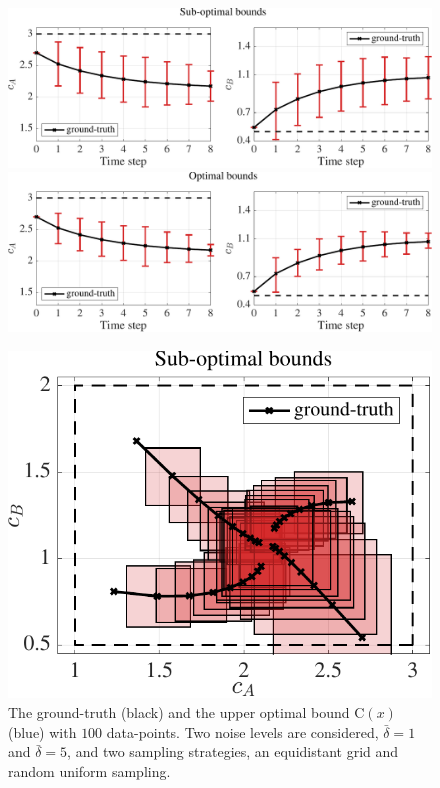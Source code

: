 \begin{figure}[t]
	\centering
	\includegraphics[scale=0.4]{../images/chap2_numex_ex3_time_subopt.pdf} \hspace{5pt}
	\includegraphics[scale=0.4]{../images/chap2_numex_ex3_time_opt.pdf}
	\caption{The ground-truth (black) and the upper optimal bound C$(x)$ (blue) with $100$ data-points. Two noise levels are considered, $\bar\delta = 1$ and $\bar\delta = 5$, and two sampling strategies, an equidistant grid and random uniform sampling.}
	\vspace{15pt}
	\includegraphics[scale=0.4]{../images/chap2_numex_ex3_phase_subopt.pdf} \hspace{5pt}

\end{figure}
